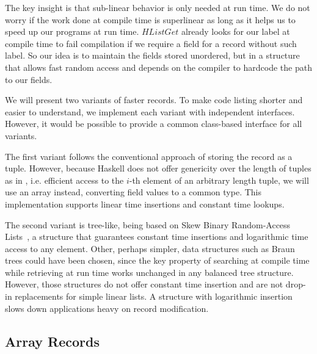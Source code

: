 \documentclass[natbib]{sigplanconf}
\newcommand{\Conid}[1]{\mathit{#1}}
\begin{document}
The key insight is that sub-linear behavior is only needed at run time.
We do not worry if the work done at compile time is superlinear
as long as it helps us to speed up our programs at run time.
\ensuremath{\Conid{HListGet}} already looks for our label at compile time
to fail compilation if we require a field for a record
without such label.
So our idea is to maintain the fields stored unordered, but
in a structure that allows fast random access and depends on the compiler to
hardcode the path to our fields.

We will present two variants of faster records.
To make code listing shorter and easier to understand,
we implement each variant with independent interfaces.
However, it would be possible to provide a common class-based interface
for all variants. 

The first variant follows the conventional approach of
storing the record as a tuple.
However, because Haskell does not offer
genericity over the length of tuples as in \cite{Tullsen00thezip}, i.e. efficient access to the $i$-th element of an arbitrary length tuple,
we will use an array instead, converting field values to a common type.
This implementation supports linear time insertions
and constant time lookups.

The second variant is tree-like, being
based on Skew Binary Random-Access Lists~\cite{OkaThesis}, a structure that guarantees constant time  insertions and logarithmic time access to any element. 
Other, perhaps simpler, data structures
such as Braun trees \cite{brauntrees} could have been chosen, since
the key property
of searching at compile time while retrieving at run time
works unchanged in any balanced tree structure.
However, those structures do not offer constant time insertion
and are not drop-in replacements for simple linear lists.
A structure with logarithmic insertion slows down
applications heavy on record modification.

\subsection{Array Records}\label{sec:array}
\end{document}
